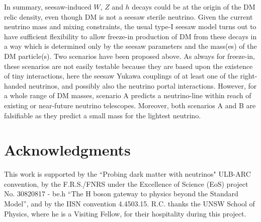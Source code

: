 \documentclass[prd,a4paper,twocolumn,preprintnumbers,nofootinbib,superscriptaddress]{revtex4}
\begin{document}
	
In summary, seesaw-induced $W$, $Z$ and $h$ decays could be at the origin of the DM relic density, even though DM is not a seesaw sterile neutrino.
Given the current neutrino mass and mixing constraints, the usual type-I seesaw model turns out to have sufficient flexibility to allow freeze-in  production of DM from these decays in a way which is determined only by the seesaw parameters and the mass(es) of the DM particle(s). Two scenarios have been proposed above. As always for freeze-in, these scenarios are not easily testable because they are based upon the existence of tiny interactions, here the seesaw Yukawa couplings of at least one of the right-handed neutrinos, and possibly also the neutrino portal interactions. However, for a whole range of DM masses, scenario A predicts a neutrino-line within reach of existing or near-future neutrino telescopes. Moreover, both scenarios A and B are falsifiable as they predict a small mass for the lightest neutrino. 
	
	
	
\section*{Acknowledgments}
This work is supported by the ``Probing dark matter with neutrinos" ULB-ARC convention, by the F.R.S./FNRS under the Excellence of Science (EoS) project No. 30820817 - be.h ``The H boson gateway to physics beyond the Standard Model'', and by the IISN convention 4.4503.15. 
R.C. thanks the UNSW School of Physics, where he is a Visiting Fellow, for their hospitality during this project.
	
	
	


	
\end{document}
